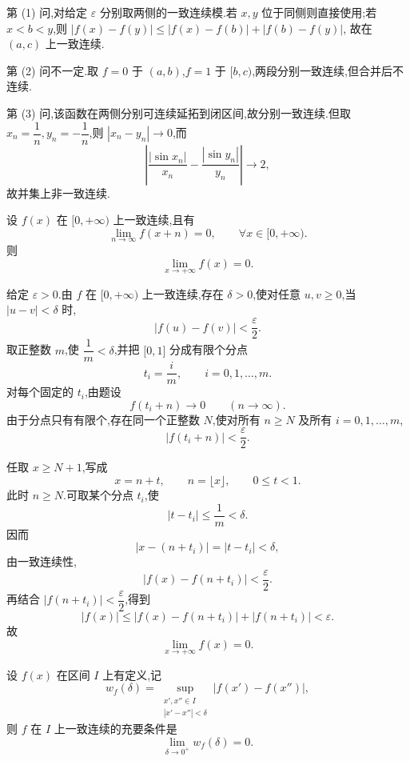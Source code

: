 \begin{solution}
    第 (1) 问,对给定 $\varepsilon$ 分别取两侧的一致连续模.若 $x,y$ 位于同侧则直接使用;若 $x<b<y$,则 $|f(x)-f(y)|\leq|f(x)-f(b)|+|f(b)-f(y)|$,
    故在 $(a,c)$ 上一致连续.

    第 (2) 问不一定.取 $f=0$ 于 $(a,b)$,$f=1$ 于 $\lbrack b,c)$,两段分别一致连续,但合并后不连续.

    第 (3) 问,该函数在两侧分别可连续延拓到闭区间,故分别一致连续.但取 $x_n=\dfrac{1}{n},y_n=-\dfrac{1}{n}$,则 $|x_n-y_n|\to0$,而
    \[
        \left|\dfrac{|\sin x_n|}{x_n}-\dfrac{|\sin y_n|}{y_n}\right|\to2,
    \]
    故并集上非一致连续.
\end{solution}

\begin{example}
    设 $f(x)$ 在 $\lbrack 0,+\infty)$ 上一致连续,且有
    \[
        \lim\limits_{n\to\infty}f(x+n)=0,\qquad \forall x\in\lbrack 0,+\infty).
    \]
    则
    \[
        \lim\limits_{x\to+\infty}f(x)=0.
    \]
\end{example}
\exampleblank

\begin{solution}
    给定 $\varepsilon>0$.由 $f$ 在 $\lbrack0,+\infty)$ 上一致连续,存在 $\delta>0$,使对任意 $u,v\geq0$,当 $|u-v|<\delta$ 时,
    \[
        |f(u)-f(v)|<\dfrac{\varepsilon}{2}.
    \]
    取正整数 $m$,使 $\dfrac{1}{m}<\delta$,并把 $\lbrack0,1\rbrack$ 分成有限个分点
    \[
        t_i=\dfrac{i}{m},\qquad i=0,1,\ldots,m.
    \]
    对每个固定的 $t_i$,由题设
    \[
        f(t_i+n)\longrightarrow0\qquad(n\to\infty).
    \]
    由于分点只有有限个,存在同一个正整数 $N$,使对所有 $n\geq N$ 及所有 $i=0,1,\ldots,m$,
    \[
        |f(t_i+n)|<\dfrac{\varepsilon}{2}.
    \]

    任取 $x\geq N+1$,写成
    \[
        x=n+t,\qquad n=\lfloor x\rfloor,\qquad 0\leq t<1.
    \]
    此时 $n\geq N$.可取某个分点 $t_i$,使
    \[
        |t-t_i|\leq\dfrac{1}{m}<\delta.
    \]
    因而
    \[
        |x-(n+t_i)|=|t-t_i|<\delta,
    \]
    由一致连续性,
    \[
        |f(x)-f(n+t_i)|<\dfrac{\varepsilon}{2}.
    \]
    再结合 $|f(n+t_i)|<\dfrac{\varepsilon}{2}$,得到
    \[
        |f(x)|
        \leq|f(x)-f(n+t_i)|+|f(n+t_i)|
        <\varepsilon.
    \]
    故
    \[
        \lim\limits_{x\to+\infty}f(x)=0.
    \]
\end{solution}

\begin{example}
    设 $f(x)$ 在区间 $I$ 上有定义,记
    \[
        w_f(\delta) =\sup\limits_{\substack{x',x''\in I\\|x'-x''|<\delta}} |f(x')-f(x'')|,
    \]
    则 $f$ 在 $I$ 上一致连续的充要条件是
    \[
        \displaystyle\lim\limits_{\delta\to0^+}w_f(\delta)=0.
    \]
\end{example}
\exampleblank

